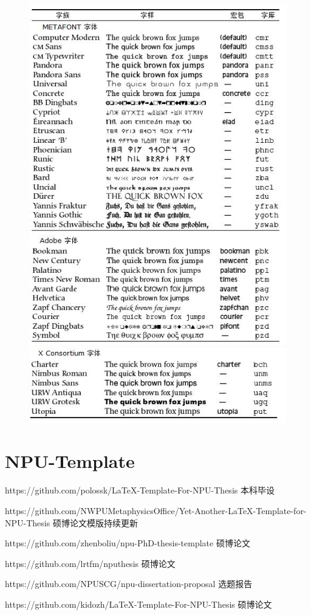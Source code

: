 \documentclass[12pt]{book}
\begin{document}
\begin{figure}[htbp]
\centering
\includegraphics[scale=0.8]{font-1.jpg}
\includegraphics[scale=0.7]{font-2.jpg}
\end{figure}

\section*{NPU-Template}

https://github.com/polossk/LaTeX-Template-For-NPU-Thesis 本科毕设

https://github.com/NWPUMetaphysicsOffice/Yet-Another-LaTeX-Template-for-NPU-Thesis 硕博论文模版持续更新

https://github.com/zhenboliu/npu-PhD-thesis-template  硕博论文

https://github.com/lrtfm/nputhesis  硕博论文

https://github.com/NPUSCG/npu-dissertation-proposal 选题报告

https://github.com/kidozh/LaTeX-Template-For-NPU-Thesis  硕博论文
\end{document}

